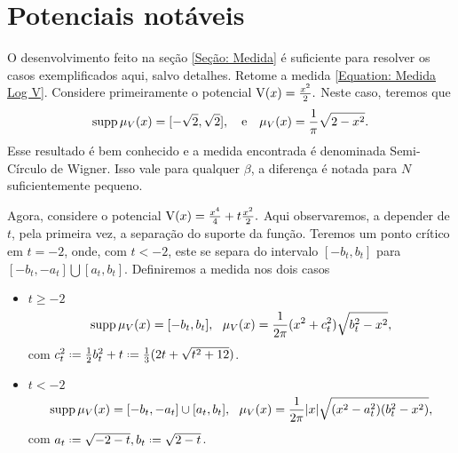 \section{Potenciais notáveis}
\label{Section: Potencias}

 O desenvolvimento feito na seção \ref{Seção: Medida} é suficiente para resolver os casos exemplificados aqui, salvo detalhes. Retome a medida \ref{Equation: Medida Log V}. Considere primeiramente o potencial $\operatorname{V}(x) = \frac{x^2}{2}.$ Neste caso, teremos que
\begin{equation}
	 \supp{\mu_V(x)} = [-\sqrt{2}, \sqrt{2}], \ \ \ \text{e} \ \ \ \mu_V(x) = \frac{1}{\pi} \sqrt{2 - x^2}.
	 \label{Equação: Quadrático}
\end{equation}
Esse resultado é bem conhecido e a medida encontrada é denominada Semi-Círculo de Wigner. Isso vale para qualquer $\beta$, a diferença é notada para $N$ suficientemente pequeno.

Agora, considere o potencial $\operatorname{V}(x) = \frac{x^4}{4} + t \frac{x^2}{2}.$ Aqui observaremos, a depender de $t$, pela primeira vez, a separação do suporte da função. Teremos um ponto crítico em $t=-2$, onde, com $t < -2$, este se separa do intervalo $[-b_t, b_t]$ para $[-b_t, -a_t] \bigcup [a_t, b_t]$. Definiremos a medida nos dois casos
\begin{itemize}
	\item \(t \geq -2\)
	\begin{equation}
	\operatorname{supp} \mu_V(x) = [-b_t, b_t], \ \ \mu_V(x) = \frac{1}{2\pi} (x^2 + c_t^2) \sqrt{b_t^2 - x^2},\label{Equação: Quartico +}
	\end{equation}
	com $c_t^2 \deff\frac{1}{2} b_t^2 + t \deff \frac{1}{3} (2t + \sqrt{t^2 + 12})$.
	\item \(t < -2\)
	\begin{equation}
	\operatorname{supp} \mu_V(x) = [-b_t, -a_t] \cup [a_t, b_t], \ \ \mu_V(x) = \frac{1}{2\pi} |x| \sqrt{(x^2 - a_t^2)(b_t^2 - x^2)},
	\label{Equação: Quartico -}
	\end{equation}
	com $ a_t \deff \sqrt{-2-t}, b_t \deff \sqrt{2-t}$.
\end{itemize}




